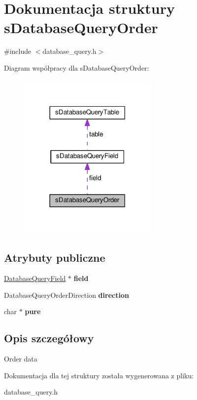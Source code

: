 \hypertarget{structsDatabaseQueryOrder}{}\section{Dokumentacja struktury s\+Database\+Query\+Order}
\label{structsDatabaseQueryOrder}


{\ttfamily \#include $<$database\+\_\+query.\+h$>$}



Diagram współpracy dla s\+Database\+Query\+Order\+:\nopagebreak
\begin{figure}[H]
\begin{center}
\leavevmode
\includegraphics[width=194pt]{structsDatabaseQueryOrder__coll__graph}
\end{center}
\end{figure}
\subsection*{Atrybuty publiczne}
\begin{DoxyCompactItemize}
\item 
\hyperlink{structsDatabaseQueryField}{Database\+Query\+Field} $\ast$ {\bfseries field}\hypertarget{structsDatabaseQueryOrder_a4cfafb9043648c011721411cabb1fc22}{}\label{structsDatabaseQueryOrder_a4cfafb9043648c011721411cabb1fc22}

\item 
Database\+Query\+Order\+Direction {\bfseries direction}\hypertarget{structsDatabaseQueryOrder_a78ffc2b3348fa8f50949885229de3cad}{}\label{structsDatabaseQueryOrder_a78ffc2b3348fa8f50949885229de3cad}

\item 
char $\ast$ {\bfseries pure}\hypertarget{structsDatabaseQueryOrder_ac2b2660647eddc285042a724d03b2476}{}\label{structsDatabaseQueryOrder_ac2b2660647eddc285042a724d03b2476}

\end{DoxyCompactItemize}


\subsection{Opis szczegółowy}
Order data 

Dokumentacja dla tej struktury została wygenerowana z pliku\+:\begin{DoxyCompactItemize}
\item 
database\+\_\+query.\+h\end{DoxyCompactItemize}
